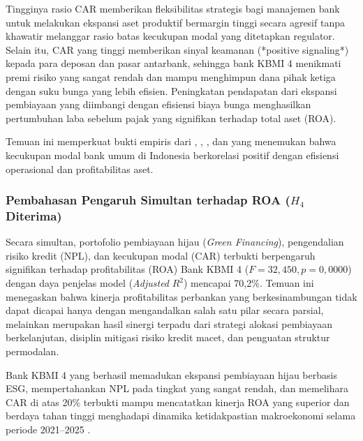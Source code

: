 \documentclass[12pt,a4paper]{article}
\numberwithin{equation}{section}
\begin{document}
\noindent
Tingginya rasio CAR memberikan fleksibilitas strategis bagi manajemen bank untuk melakukan ekspansi aset produktif bermargin tinggi secara agresif tanpa khawatir melanggar rasio batas kecukupan modal yang ditetapkan regulator. Selain itu, CAR yang tinggi memberikan sinyal keamanan (*positive signaling*) kepada para deposan dan pasar antarbank, sehingga bank KBMI 4 menikmati premi risiko yang sangat rendah dan mampu menghimpun dana pihak ketiga dengan suku bunga yang lebih efisien. Peningkatan pendapatan dari ekspansi pembiayaan yang diimbangi dengan efisiensi biaya bunga menghasilkan pertumbuhan laba sebelum pajak yang signifikan terhadap total aset (ROA).

\noindent
Temuan ini memperkuat bukti empiris dari \citet{LestariPurnomo2023}, \citet{NugrohoUtami2021}, \citet{Pramono2022}, dan \citet{HaryantoSudarno2023} yang menemukan bahwa kecukupan modal bank umum di Indonesia berkorelasi positif dengan efisiensi operasional dan profitabilitas aset.

\subsubsection{Pembahasan Pengaruh Simultan terhadap ROA \texorpdfstring{($H_4$ Diterima)}{(H4 Diterima)}}
\noindent
Secara simultan, portofolio pembiayaan hijau (\emph{Green Financing}), pengendalian risiko kredit (NPL), dan kecukupan modal (CAR) terbukti berpengaruh signifikan terhadap profitabilitas (ROA) Bank KBMI 4 ($F = 32{,}450, p = 0{,}0000$) dengan daya penjelas model (\emph{Adjusted} $R^2$) mencapai 70,2\%. Temuan ini menegaskan bahwa kinerja profitabilitas perbankan yang berkesinambungan tidak dapat dicapai hanya dengan mengandalkan salah satu pilar secara parsial, melainkan merupakan hasil sinergi terpadu dari strategi alokasi pembiayaan berkelanjutan, disiplin mitigasi risiko kredit macet, dan penguatan struktur permodalan.

\noindent
Bank KBMI 4 yang berhasil memadukan ekspansi pembiayaan hijau berbasis ESG, mempertahankan NPL pada tingkat yang sangat rendah, dan memelihara CAR di atas 20\% terbukti mampu mencatatkan kinerja ROA yang superior dan berdaya tahan tinggi menghadapi dinamika ketidakpastian makroekonomi selama periode 2021--2025 \citep{WulandariRahardjo2022, Chiaramonte2020}.
\end{document}
